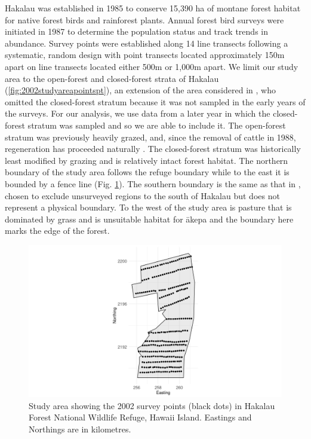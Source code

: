 \documentclass{stylefile16/statsoc}
\newcommand{\akepa}{\textquotesingle\={a}kepa}  %
\newcommand{\hawaii}{Hawai\textquotesingle i}   %
\begin{document}
Hakalau was established in 1985 to conserve 15,390 ha of montane forest habitat for native forest birds and rainforest plants. Annual forest bird surveys were initiated in 1987 to determine the population status and track trends in abundance. Survey points were established along 14 line transects following a systematic, random design with point transects located approximately 150m apart on line transects located either 500m or 1,000m apart. We limit our study area to the open-forest and closed-forest strata of Hakalau (\autoref{fig:2002studyareapointspt}), an extension of the area considered in \cite{camp_population_2010, camp_statespace_2016}, who omitted the closed-forest stratum because it was not sampled in the early years of the surveys.  For our analysis, we use data from a later year in which the closed-forest stratum was sampled and so we are able to include it.  The open-forest stratum was previously heavily grazed, and, since the removal of cattle in 1988, regeneration has proceeded naturally \citep{maxfield_hakalau_1998}. The closed-forest stratum was historically least modified by grazing and is relatively intact forest habitat.  The northern boundary of the study area follows the refuge boundary while to the east it is bounded by a fence line (Fig. \ref{fig:2002studyareapointspt}). The southern boundary is the same as that in \cite{camp_population_2010}, chosen to exclude unsurveyed regions to the south of Hakalau but does not represent a physical boundary. To the west of the study area is pasture that is dominated by grass and is unsuitable habitat for \akepa{} and the boundary here marks the edge of the forest.

\begin{figure}
	\centering
	\includegraphics[scale=0.5]{figures/study_area_design.png}
	\caption{Study area showing the 2002 survey points (black dots) in Hakalau Forest National Wildlife Refuge, \hawaii{} Island.  Eastings and Northings are in kilometres.}
	\label{fig:2002studyareapointspt}
\end{figure}
\end{document}
